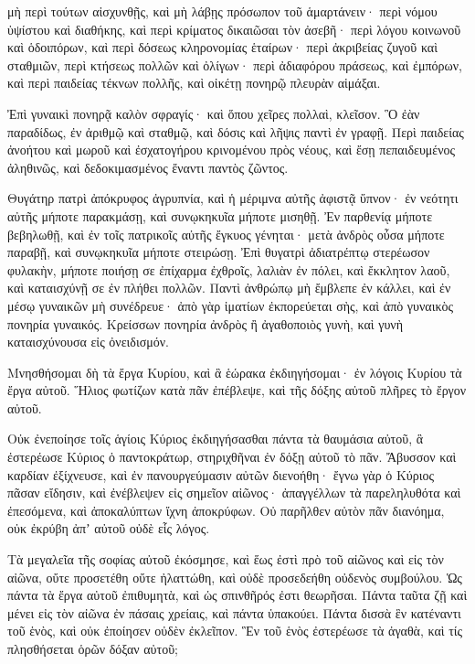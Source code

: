 {μὴ περὶ τούτων αἰσχυνθῇς, καὶ μὴ λάβῃς πρόσωπον τοῦ ἁμαρτάνειν·
περὶ νόμου ὑψίστου καὶ διαθήκης, καὶ περὶ κρίματος δικαιῶσαι τὸν ἀσεβῆ·
περὶ λόγου κοινωνοῦ καὶ ὁδοιπόρων, καὶ περὶ δόσεως κληρονομίας ἑταίρων·
περὶ ἀκριβείας ζυγοῦ καὶ σταθμιῶν, περὶ κτήσεως πολλῶν καὶ ὀλίγων·
περὶ ἀδιαφόρου πράσεως, καὶ ἐμπόρων, καὶ περὶ παιδείας τέκνων πολλῆς, καὶ οἰκέτῃ πονηρῷ πλευρὰν αἱμάξαι.
\par }{\PP {}Ἐπὶ γυναικὶ πονηρᾷ καλὸν σφραγίς· καὶ ὅπου χεῖρες πολλαὶ, κλεῖσον.
Ὃ ἐὰν παραδίδως, ἐν ἀριθμῷ καὶ σταθμῷ, καὶ δόσις καὶ λῆψις παντὶ ἐν γραφῇ.
Περὶ παιδείας ἀνοήτου καὶ μωροῦ καὶ ἐσχατογήρου κρινομένου πρὸς νέους, καὶ ἔσῃ πεπαιδευμένος ἀληθινῶς, καὶ δεδοκιμασμένος ἔναντι παντὸς ζῶντος.
\par }{\PP {}Θυγάτηρ πατρὶ ἀπόκρυφος ἀγρυπνία, καὶ ἡ μέριμνα αὐτῆς ἀφιστᾷ ὕπνον· ἐν νεότητι αὐτῆς μήποτε παρακμάσῃ, καὶ συνῳκηκυῖα μήποτε μισηθῇ.
Ἐν παρθενίᾳ μήποτε βεβηλωθῇ, καὶ ἐν τοῖς πατρικοῖς αὐτῆς ἔγκυος γένηται· μετὰ ἀνδρὸς οὖσα μήποτε παραβῇ, καὶ συνῳκηκυῖα μήποτε στειρώσῃ.
Ἐπὶ θυγατρὶ ἀδιατρέπτῳ στερέωσον φυλακὴν, μήποτε ποιήσῃ σε ἐπίχαρμα ἐχθροῖς, λαλιὰν ἐν πόλει, καὶ ἔκκλητον λαοῦ, καὶ καταισχύνῇ σε ἐν πλήθει πολλῶν.
Παντὶ ἀνθρώπῳ μὴ ἔμβλεπε ἐν κάλλει, καὶ ἐν μέσῳ γυναικῶν μὴ συνέδρευε·
ἀπὸ γὰρ ἱματίων ἐκπορεύεται σὴς, καὶ ἀπὸ γυναικὸς πονηρία γυναικός.
Κρείσσων πονηρία ἀνδρὸς ἢ ἀγαθοποιὸς γυνὴ, καὶ γυνὴ καταισχύνουσα εἰς ὀνειδισμόν.
\par }{\PP {}Μνησθήσομαι δὴ τὰ ἔργα Κυρίου, καὶ ἃ ἑώρακα ἐκδιηγήσομαι· ἐν λόγοις Κυρίου τὰ ἔργα αὐτοῦ.
Ἥλιος φωτίζων κατὰ πᾶν ἐπέβλεψε, καὶ τῆς δόξης αὐτοῦ πλῆρες τὸ ἔργον αὐτοῦ.
\par }{\PP {}Οὐκ ἐνεποίησε τοῖς ἁγίοις Κύριος ἐκδιηγήσασθαι πάντα τὰ θαυμάσια αὐτοῦ, ἃ ἐστερέωσε Κύριος ὁ παντοκράτωρ, στηριχθῆναι ἐν δόξῃ αὐτοῦ τὸ πᾶν.
Ἄβυσσον καὶ καρδίαν ἐξίχνευσε, καὶ ἐν πανουργεύμασιν αὐτῶν διενοήθη· ἔγνω γὰρ ὁ Κύριος πᾶσαν εἴδησιν, καὶ ἐνέβλεψεν εἰς σημεῖον αἰῶνος·
ἀπαγγέλλων τὰ παρεληλυθότα καὶ ἐπεσόμενα, καὶ ἀποκαλύπτων ἴχνη ἀποκρύφων.
Οὐ παρῆλθεν αὐτὸν πᾶν διανόημα, οὐκ ἐκρύβη ἀπʼ αὐτοῦ οὐδὲ εἷς λόγος.
\par }{\PP {}Τὰ μεγαλεῖα τῆς σοφίας αὐτοῦ ἐκόσμησε, καὶ ἕως ἐστὶ πρὸ τοῦ αἰῶνος καὶ εἰς τὸν αἰῶνα, οὔτε προσετέθη οὔτε ἠλαττώθη, καὶ οὐδὲ προσεδεήθη οὐδενὸς συμβούλου.
Ὡς πάντα τὰ ἔργα αὐτοῦ ἐπιθυμητὰ, καὶ ὡς σπινθῆρός ἐστι θεωρῆσαι.
Πάντα ταῦτα ζῇ καὶ μένει εἰς τὸν αἰῶνα ἐν πάσαις χρείαις, καὶ πάντα ὑπακούει.
Πάντα δισσὰ ἓν κατέναντι τοῦ ἑνὸς, καὶ οὐκ ἐποίησεν οὐδὲν ἐκλεῖπον.
Ἓν τοῦ ἑνὸς ἐστερέωσε τὰ ἀγαθὰ, καὶ τίς πλησθήσεται ὁρῶν δόξαν αὐτοῦ;

}
